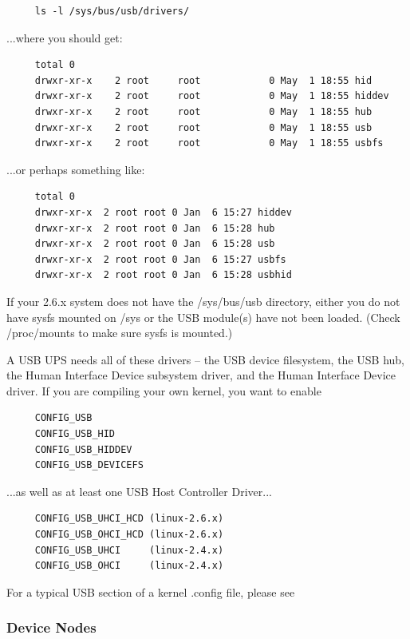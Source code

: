 \begin{verbatim}
     ls -l /sys/bus/usb/drivers/
\end{verbatim}

...where you should get:

\begin{verbatim}
     total 0
     drwxr-xr-x    2 root     root            0 May  1 18:55 hid
     drwxr-xr-x    2 root     root            0 May  1 18:55 hiddev
     drwxr-xr-x    2 root     root            0 May  1 18:55 hub
     drwxr-xr-x    2 root     root            0 May  1 18:55 usb
     drwxr-xr-x    2 root     root            0 May  1 18:55 usbfs
\end{verbatim}

...or perhaps something like:

\begin{verbatim}
     total 0
     drwxr-xr-x  2 root root 0 Jan  6 15:27 hiddev
     drwxr-xr-x  2 root root 0 Jan  6 15:28 hub
     drwxr-xr-x  2 root root 0 Jan  6 15:28 usb
     drwxr-xr-x  2 root root 0 Jan  6 15:27 usbfs
     drwxr-xr-x  2 root root 0 Jan  6 15:28 usbhid
\end{verbatim}

If your 2.6.x system does not have the /sys/bus/usb directory, either you do
not have sysfs mounted on /sys or the USB module(s) have not been loaded. 
(Check /proc/mounts to make sure sysfs is mounted.)  

A USB UPS needs all of these drivers {--} the USB device filesystem, the USB
hub, the Human Interface Device subsystem driver, and the Human Interface
Device driver. If you are compiling your own kernel, you want to enable

\begin{verbatim}
     CONFIG_USB
     CONFIG_USB_HID
     CONFIG_USB_HIDDEV
     CONFIG_USB_DEVICEFS
\end{verbatim}

...as well as at least one USB Host Controller Driver...

\begin{verbatim}
     CONFIG_USB_UHCI_HCD (linux-2.6.x)
     CONFIG_USB_OHCI_HCD (linux-2.6.x)
     CONFIG_USB_UHCI     (linux-2.4.x)
     CONFIG_USB_OHCI     (linux-2.4.x)
\end{verbatim}

For a typical USB section of a kernel .config file, please see

\subsubsection*{Device Nodes}

